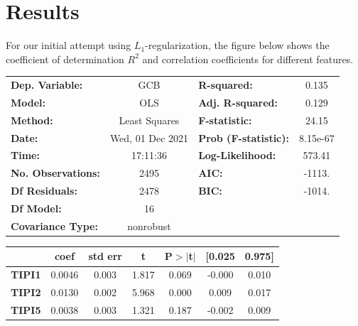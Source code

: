 \documentclass{article}[11pt]
\begin{document}
\section*{Results}
For our initial attempt using \(L_1\)-regularization, the figure below
shows the coefficient of determination \(R^2\) and correlation
coefficients for different features.
\begin{center}
\begin{tabular}{lclc}
\toprule
\textbf{Dep. Variable:}                &       GCB        & \textbf{  R-squared:         } &     0.135   \\
\textbf{Model:}                        &       OLS        & \textbf{  Adj. R-squared:    } &     0.129   \\
\textbf{Method:}                       &  Least Squares   & \textbf{  F-statistic:       } &     24.15   \\
\textbf{Date:}                         & Wed, 01 Dec 2021 & \textbf{  Prob (F-statistic):} &  8.15e-67   \\
\textbf{Time:}                         &     17:11:36     & \textbf{  Log-Likelihood:    } &    573.41   \\
\textbf{No. Observations:}             &        2495      & \textbf{  AIC:               } &    -1113.   \\
\textbf{Df Residuals:}                 &        2478      & \textbf{  BIC:               } &    -1014.   \\
\textbf{Df Model:}                     &          16      & \textbf{                     } &             \\
\textbf{Covariance Type:}              &    nonrobust     & \textbf{                     } &             \\
\bottomrule
\end{tabular}
\begin{tabular}{lcccccc}
                                       & \textbf{coef} & \textbf{std err} & \textbf{t} & \textbf{P$> |$t$|$} & \textbf{[0.025} & \textbf{0.975]}  \\
\midrule
\textbf{TIPI1}                         &       0.0046  &        0.003     &     1.817  &         0.069        &       -0.000    &        0.010     \\
\textbf{TIPI2}                         &       0.0130  &        0.002     &     5.968  &         0.000        &        0.009    &        0.017     \\
\textbf{TIPI5}                         &       0.0038  &        0.003     &     1.321  &         0.187        &       -0.002    &        0.009     \\

\end{tabular}
\end{center}
\end{document}
